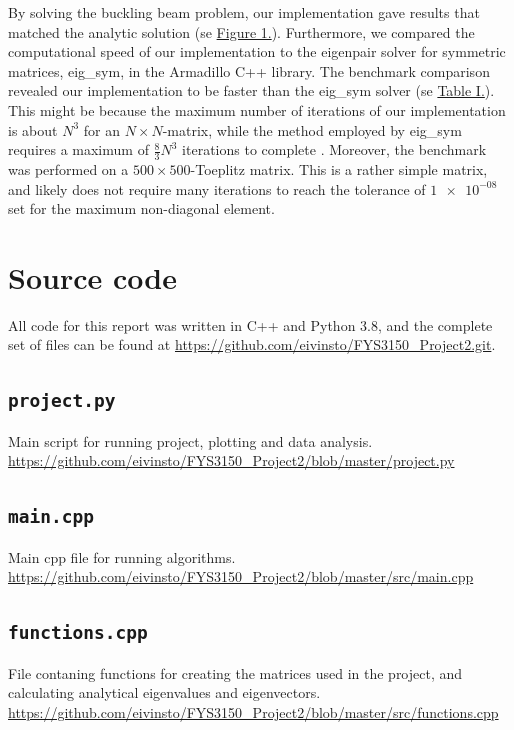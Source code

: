 \documentclass[reprint,english,notitlepage]{revtex4-1}  %
\begin{document}
By solving the buckling beam problem, our implementation gave results that matched the analytic solution (se \hyperref[fig:IV:a:1]{Figure 1.}). Furthermore, we compared the computational speed of our implementation to the eigenpair solver for symmetric matrices, eig\_sym, in the Armadillo C++ library. The benchmark comparison revealed our implementation to be faster than the eig\_sym solver (se \hyperref[table:IV:a:1]{Table I.}). This might be because the maximum number of iterations of our implementation is about \(N^{3}\) for an \(N\times N\)-matrix, while the method employed by eig\_sym requires a maximum of \(\frac{8}{3}N^{3}\) iterations to complete \citep{Cuppen}. Moreover, the benchmark was performed on a \(500\times 500\)-Toeplitz matrix. This is a rather simple matrix, and likely does not require many iterations to reach the tolerance of \(\num{1e-08}\) set for the maximum non-diagonal element. 

{}

\appendix
\section{Source code} \label{A}
All code for this report was written in C++ and Python 3.8, and the complete set of files can be found at \url{https://github.com/eivinsto/FYS3150_Project2.git}.

\cprotect\subsection{\verb+project.py+} \label{A.1}
Main script for running project, plotting and data analysis.
\url{https://github.com/eivinsto/FYS3150_Project2/blob/master/project.py}

\cprotect\subsection{\verb+main.cpp+} \label{A.2}
Main cpp file for running algorithms.
\url{https://github.com/eivinsto/FYS3150_Project2/blob/master/src/main.cpp}

\cprotect\subsection{\verb+functions.cpp+} \label{A.3}
File contaning functions for creating the matrices used in the project, and calculating analytical eigenvalues and eigenvectors.
\url{https://github.com/eivinsto/FYS3150_Project2/blob/master/src/functions.cpp}
\end{document}
